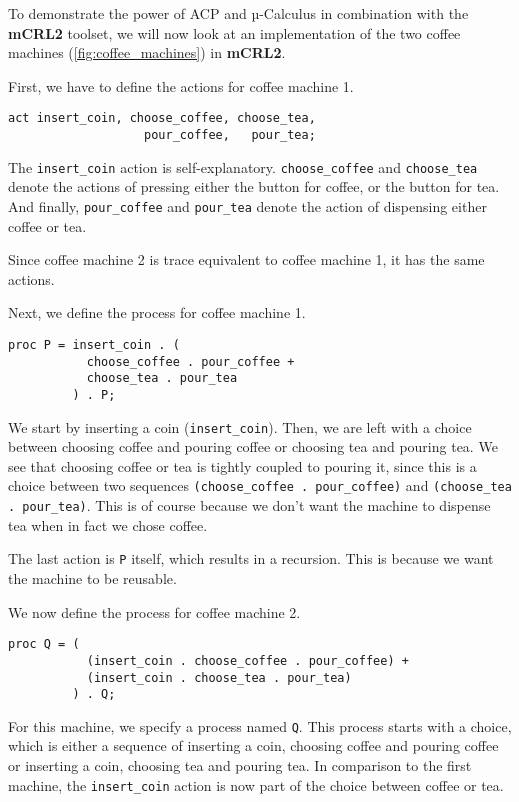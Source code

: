 \documentclass{clseminar}
\begin{document}
  To demonstrate the power of ACP and µ-Calculus in combination with the \textbf{mCRL2} toolset, we will now look at an implementation of the two coffee machines (\autoref{fig:coffee_machines}) in \textbf{mCRL2}.

  First, we have to define the actions for coffee machine 1.

  \begin{lstlisting}[language=mCRL2]
act insert_coin, choose_coffee, choose_tea,
                   pour_coffee,   pour_tea;
  \end{lstlisting}

  The \texttt{insert\_coin} action is self-explanatory. \texttt{choose\_coffee} and \texttt{choose\_tea} denote the actions of pressing either the button for coffee, or the button for tea. And finally, \texttt{pour\_coffee} and \texttt{pour\_tea} denote the action of dispensing either coffee or tea.

  Since coffee machine 2 is trace equivalent to coffee machine 1, it has the same actions.

  Next, we define the process for coffee machine 1.

  \begin{lstlisting}[language=mCRL2]
proc P = insert_coin . (
           choose_coffee . pour_coffee +
           choose_tea . pour_tea
         ) . P;
  \end{lstlisting}

  We start by inserting a coin (\texttt{insert\_coin}). Then, we are left with a choice between choosing coffee and pouring coffee or choosing tea and pouring tea. We see that choosing coffee or tea is tightly coupled to pouring it, since this is a choice between two sequences \texttt{(choose\_coffee . pour\_coffee)} and \texttt{(choose\_tea . pour\_tea)}. This is of course because we don't want the machine to dispense tea when in fact we chose coffee.

  The last action is \texttt{P} itself, which results in a recursion. This is because we want the machine to be reusable.

  We now define the process for coffee machine 2.

  \begin{lstlisting}[language=mCRL2]
proc Q = (
           (insert_coin . choose_coffee . pour_coffee) +
           (insert_coin . choose_tea . pour_tea)
         ) . Q;
  \end{lstlisting}

  For this machine, we specify a process named \texttt{Q}. This process starts with a choice, which is either a sequence of inserting a coin, choosing coffee and pouring coffee or inserting a coin, choosing tea and pouring tea. In comparison to the first machine, the \texttt{insert\_coin} action is now part of the choice between coffee or tea.
\end{document}

